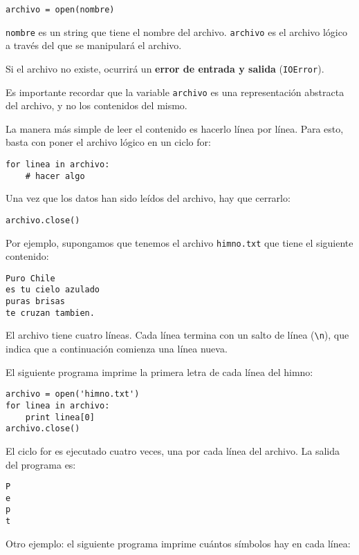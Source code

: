 \begin{lstlisting}
archivo = open(nombre)
\end{lstlisting}

\lstinline!nombre! es un string que tiene el nombre del archivo.
\lstinline!archivo! es el archivo lógico a través del que se manipulará
el archivo.

Si el archivo no existe, ocurrirá un \textbf{error de entrada y salida}
(\lstinline!IOError!).

Es importante recordar que la variable \lstinline!archivo! es una
representación abstracta del archivo, y no los contenidos del mismo.

La manera más simple de leer el contenido es hacerlo línea por línea.
Para esto, basta con poner el archivo lógico en un ciclo for:

\begin{lstlisting}
for linea in archivo:
    # hacer algo
\end{lstlisting}

Una vez que los datos han sido leídos del archivo, hay que cerrarlo:

\begin{lstlisting}
archivo.close()
\end{lstlisting}

Por ejemplo, supongamos que tenemos el archivo \lstinline!himno.txt! que
tiene el siguiente contenido:

\begin{lstlisting}[language=file]
Puro Chile
es tu cielo azulado
puras brisas
te cruzan tambien.
\end{lstlisting}

El archivo tiene cuatro líneas. Cada línea termina con un salto de línea
(\lstinline!\n!), que indica que a continuación comienza una línea
nueva.

El siguiente programa imprime la primera letra de cada línea del himno:

\begin{lstlisting}
archivo = open('himno.txt')
for linea in archivo:
    print linea[0]
archivo.close()
\end{lstlisting}

El ciclo for es ejecutado cuatro veces, una por cada línea del archivo.
La salida del programa es:
\begin{lstlisting}[language=testcase]
P
e
p
t
\end{lstlisting}

Otro ejemplo: el siguiente programa imprime cuántos símbolos hay en cada
línea:

